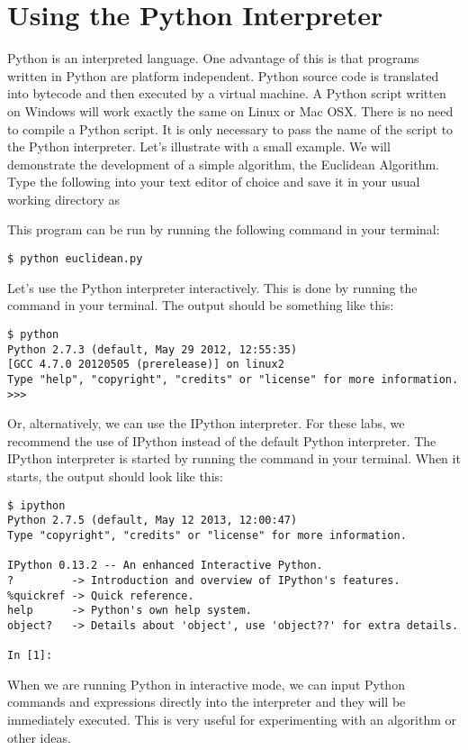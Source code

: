 \section*{Using the Python Interpreter}
Python is an interpreted language.
One advantage of this is that programs written in Python are platform independent.
Python source code is translated into bytecode and then executed by a virtual machine.
A Python script written on Windows will work exactly the same on Linux or Mac OSX.
There is no need to compile a Python script.
It is only necessary to pass the name of the script to the Python interpreter.
Let's illustrate with a small example.
We will demonstrate the development of a simple algorithm, the Euclidean Algorithm.
Type the following into your text editor of choice and save it in your usual working directory as 

This program can be run by running the following command in your terminal:
\begin{lstlisting}
$ python euclidean.py
\end{lstlisting}

Let's use the Python interpreter interactively.
This is done by running the command  in your terminal.
The output should be something like this:
\begin{lstlisting}
$ python
Python 2.7.3 (default, May 29 2012, 12:55:35)
[GCC 4.7.0 20120505 (prerelease)] on linux2
Type "help", "copyright", "credits" or "license" for more information.
>>>
\end{lstlisting}
Or, alternatively, we can use the IPython interpreter.
For these labs, we recommend the use of IPython instead of the default Python interpreter.
The IPython interpreter is started by running the command  in your terminal.
When it starts, the output should look like this:
\begin{lstlisting}
$ ipython
Python 2.7.5 (default, May 12 2013, 12:00:47)
Type "copyright", "credits" or "license" for more information.

IPython 0.13.2 -- An enhanced Interactive Python.
?         -> Introduction and overview of IPython's features.
%quickref -> Quick reference.
help      -> Python's own help system.
object?   -> Details about 'object', use 'object??' for extra details.

In [1]:
\end{lstlisting}
When we are running Python in interactive mode, we can input Python commands and expressions directly into the interpreter and they will be immediately executed.
This is very useful for experimenting with an algorithm or other ideas.

